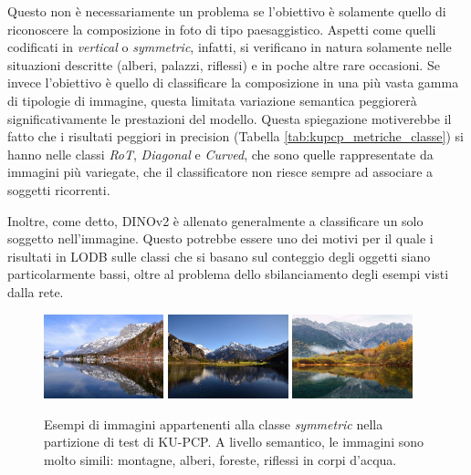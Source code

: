 Questo non è necessariamente un problema se l'obiettivo è solamente quello di riconoscere la composizione in foto di tipo paesaggistico. Aspetti come quelli codificati in \textit{vertical} o \textit{symmetric}, infatti, si verificano in natura solamente nelle situazioni descritte (alberi, palazzi, riflessi) e in poche altre rare occasioni. Se invece l'obiettivo è quello di classificare la composizione in una più vasta gamma di tipologie di immagine, questa limitata variazione semantica peggiorerà significativamente le prestazioni del modello. Questa spiegazione motiverebbe il fatto che i risultati peggiori in precision (Tabella \ref{tab:kupcp_metriche_classe}) si hanno nelle classi \textit{RoT}, \textit{Diagonal} e \textit{Curved}, che sono quelle rappresentate da immagini più variegate, che il classificatore non riesce sempre ad associare a soggetti ricorrenti.

Inoltre, come detto, DINOv2 è allenato generalmente a classificare un solo soggetto nell'immagine. Questo potrebbe essere uno dei motivi per il quale i risultati in LODB sulle classi che si basano sul conteggio degli oggetti siano particolarmente bassi, oltre al problema dello sbilanciamento degli esempi visti dalla rete. 

\begin{figure}[b]
    \centering
    \includegraphics[width=0.31\textwidth]{Immagini/conclusioni/0064.jpg}
    \hspace{2mm}
    \includegraphics[width=0.31\textwidth]{Immagini/conclusioni/0237.jpg}
    \hspace{2mm}
    \includegraphics[width=0.31\textwidth]{Immagini/conclusioni/0820.jpg}
    \caption{Esempi di immagini appartenenti alla classe \textit{symmetric} nella partizione di test di KU-PCP. A livello semantico, le immagini sono molto simili: montagne, alberi, foreste, riflessi in corpi d'acqua.}
    \label{fig:symmetric_examples}
\end{figure}


